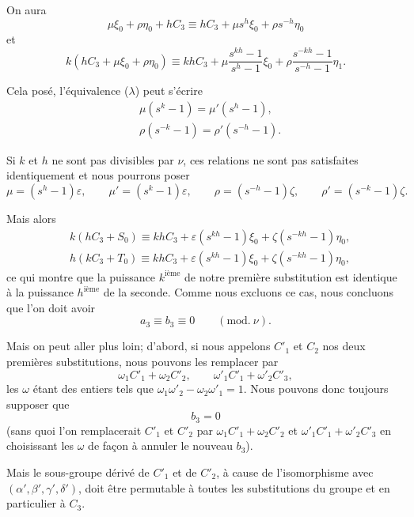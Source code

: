\documentclass{article}
\begin{document}
On aura
\[ \mu\xi_{0} + \rho\eta_{0} + hC_{3} \equiv hC_{3} + \mu s^{h}\xi_{0} + \rho s^{-h}\eta_{0} \]
et
\[ k(hC_{3} + \mu\xi_{0} + \rho\eta_{0}) \equiv khC_{3} + \mu\frac{s^{kh} - 1}{s^{h} - 1}\xi_{0} + \rho\frac{s^{-kh} - 1}{s^{-h} - 1}\eta_{1}. \]

Cela posé, l'équivalence ($\lambda$) peut s'écrire
\[ \begin{aligned} &\mu(s^{k} - 1) = \mu'(s^{h} - 1),\\ &\rho(s^{-k} - 1) = \rho'(s^{-h} - 1). \end{aligned} \]

Si $k$ et $h$ ne sont pas divisibles par $\nu$, ces relations ne sont pas satisfaites
identiquement et nous pourrons poser
\[ \mu = (s^{h} - 1)\varepsilon, \qquad \mu' = (s^{k} - 1)\varepsilon, \qquad \rho = (s^{-h} - 1)\zeta, \qquad \rho' = (s^{-k} - 1)\zeta. \]

Mais alors
\[ \begin{aligned} &k(hC_{3} + S_{0}) \equiv khC_{3} + \varepsilon(s^{kh} - 1)\xi_{0} + \zeta(s^{-kh} - 1)\eta_{0},\\ &h(kC_{3} + T_{0}) \equiv khC_{3} + \varepsilon(s^{kh} - 1)\xi_{0} + \zeta(s^{-kh} - 1)\eta_{0}, \end{aligned} \]
ce qui montre que la puissance $k^{\text{ième}}$ de notre première substitution est identique à la puissance $h^{\text{ième}}$ de la seconde. Comme nous excluons ce cas, nous concluons que l'on doit avoir
\[ a_{3} \equiv b_{3} \equiv 0 \qquad (\text{mod.}\ \nu). \]

Mais on peut aller plus loin; d'abord, si nous appelons $C'_{1}$ et $C_{2}$ nos deux premières substitutions, nous pouvons les remplacer par
\[ \omega_{1}C'_{1} + \omega_{2}C'_{2}, \qquad \omega'_{1}C'_{1} + \omega'_{2}C'_{3}, \]
les $\omega$ étant des entiers tels que $\omega_{1}\omega'_{2} - \omega_{2}\omega'_{1} = 1$. Nous pouvons donc toujours supposer que
\[ b_{3} = 0 \]
(sans quoi l'on remplacerait $C'_{1}$ et $C'_{2}$ par $\omega_{1}C'_{1} + \omega_{2}C'_{2}$ et $\omega'_{1}C'_{1} + \omega'_{2}C'_{3}$ en choisissant les $\omega$ de façon à annuler le nouveau $b_{3}$).

Mais le sous-groupe dérivé de $C'_{1}$ et de $C'_{2}$, à cause de l'isomorphisme avec $(\alpha', \beta', \gamma', \delta')$, doit être permutable à toutes les substitutions du groupe et en particulier à $C_{3}$.
\end{document}
